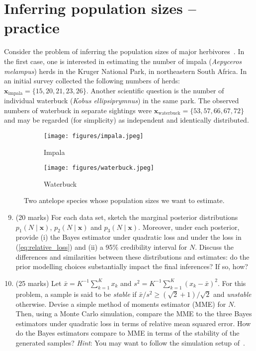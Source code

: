 \documentclass[a4paper,10pt, notitlepage]{report}
\begin{document}
\section*{Inferring population sizes -- practice}
Consider the problem of inferring the population sizes of major herbivores~\citep{Carroll1985}.
In the first case, one is interested in estimating the number of impala (\textit{Aepyceros melampus}) herds in the Kruger National Park, in northeastern South Africa.
In an initial survey collected the following numbers of herds: $\boldsymbol{x}_{\text{impala}} = \{15, 20, 21, 23, 26\}$.
Another scientific question is the number of individual waterbuck (\textit{Kobus ellipsiprymnus}) in the same park.
The observed numbers of waterbuck in separate sightings were $\boldsymbol{x}_{\text{waterbuck}} = \{53, 57, 66, 67, 72\}$ and may be regarded (for simplicity) as independent and identically distributed.

\begin{figure}[H]
     \centering
     \begin{subfigure}[b]{0.45\textwidth}
         \centering
         \texttt{[image: figures/impala.jpeg]}
         \caption{Impala}
     \end{subfigure}
     \begin{subfigure}[b]{0.45\textwidth}
         \centering
         \texttt{[image: figures/waterbuck.jpeg]}
         \caption{Waterbuck}
     \end{subfigure}
        \caption{Two antelope species whose population sizes we want to estimate.}
        \label{fig:antelopes}
\end{figure}


\begin{enumerate}[label=\alph*)]
\setcounter{enumi}{8}
 \item (20 marks) For each data set, sketch the marginal posterior distributions $p_1(N \mid \boldsymbol{x})$, $p_2(N \mid \boldsymbol{x})$ and $p_3(N \mid \boldsymbol{x})$.
 Moreover, under each posterior,  provide (i) the Bayes estimator under quadratic loss and under the loss in (\ref{eq:relative_loss}) and (ii) a 95\% credibility interval for $N$.
 Discuss the differences and similarities between these distributions and
 estimates: do the prior modelling choices substantially impact the final
 inferences? If so, how?
 
 

 \item (25 marks) Let $\bar{x} = K^{-1}\sum_{k =1}^K x_k$ and $s^2 = K^{-1}\sum_{k =1}^K (x_k-\bar{x})^2$.
 For this problem, a sample is said to be \textit{stable} if $\bar{x}/s^2 \geq (\sqrt{2} + 1)/\sqrt{2}$ and \textit{unstable} otherwise.
 Devise a simple method of moments estimator (MME) for $N$.
 Then, using a Monte Carlo simulation, compare the MME to the three Bayes estimators under quadratic loss in terms of relative mean squared error. 
 How do the Bayes estimators compare to MME in terms of the stability of the generated samples? 
 \textit{Hint}: You may want to follow the simulation setup
 of~\cite{Carroll1985}. 
 
 

\end{enumerate}
\end{document}

